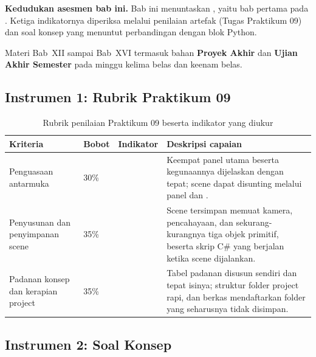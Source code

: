 \label{sec:asesmen-unity}

\begin{asesmenbox}
\textbf{Kedudukan asesmen bab ini.} Bab ini menuntaskan , yaitu
bab pertama pada . Ketiga indikatornya diperiksa melalui penilaian
artefak  (Tugas Praktikum 09) dan soal konsep yang menuntut
perbandingan dengan blok Python.

\vspace{0.4em}
Materi Bab~XII sampai Bab~XVI termasuk bahan \textbf{Proyek Akhir} dan
\textbf{Ujian Akhir Semester} pada minggu kelima belas dan keenam belas.
\end{asesmenbox}

\subsection*{Instrumen 1: Rubrik Praktikum 09}

\begin{table}[htbp]
\centering
\caption{Rubrik penilaian Praktikum 09 beserta indikator yang diukur}
\label{tab:rubrik-praktikum-09}
{\setlength{\tabcolsep}{4pt}\footnotesize%
\begin{tabularx}{\textwidth}{@{}L{3.2cm} C{1.3cm} C{2.1cm} Y@{}}
\toprule
\headrow \textbf{Kriteria} & \textbf{Bobot} & \textbf{Indikator} & \textbf{Deskripsi capaian} \\
\midrule
Penguasaan antarmuka & 30\% &  &
Keempat panel utama beserta kegunaannya dijelaskan dengan tepat; scene dapat
disunting melalui panel  dan . \\
\addlinespace
Penyusunan dan penyimpanan scene & 35\% &  &
Scene tersimpan memuat kamera, pencahayaan, dan sekurang-kurangnya tiga objek
primitif, beserta skrip C\# yang berjalan ketika scene dijalankan. \\
\addlinespace
Padanan konsep dan kerapian project & 35\% &  &
Tabel padanan disusun sendiri dan tepat isinya; struktur folder project rapi,
dan berkas  mendaftarkan folder yang seharusnya tidak
disimpan. \\
\bottomrule
\end{tabularx}}
\end{table}

\subsection*{Instrumen 2: Soal Konsep}


